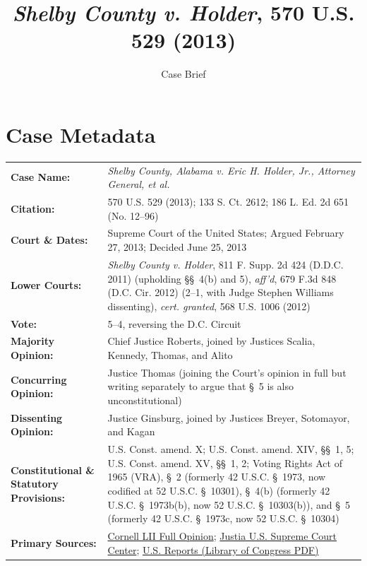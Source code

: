 \documentclass[12pt]{article}
\title{\textit{Shelby County v. Holder}, 570 U.S. 529 (2013)}
\author{Case Brief}
\date{}
\begin{document}
\maketitle


\section{Case Metadata}

\begin{tabular}{@{}p{}p{}@{}}
\textbf{Case Name:} & \emph{Shelby County, Alabama v. Eric H. Holder, Jr., Attorney General, et al.} \\
\textbf{Citation:} & 570 U.S. 529 (2013); 133 S. Ct. 2612; 186 L. Ed. 2d 651 (No. 12--96) \\
\textbf{Court \& Dates:} & Supreme Court of the United States; Argued February 27, 2013; Decided June 25, 2013 \\
\textbf{Lower Courts:} & \emph{Shelby County v. Holder}, 811 F. Supp. 2d 424 (D.D.C. 2011) (upholding \S\S~4(b) and 5), \emph{aff'd}, 679 F.3d 848 (D.C. Cir. 2012) (2--1, with Judge Stephen Williams dissenting), \emph{cert. granted}, 568 U.S. 1006 (2012) \\
\textbf{Vote:} & 5--4, reversing the D.C. Circuit \\
\textbf{Majority Opinion:} & Chief Justice Roberts, joined by Justices Scalia, Kennedy, Thomas, and Alito \\
\textbf{Concurring Opinion:} & Justice Thomas (joining the Court's opinion in full but writing separately to argue that \S~5 is also unconstitutional) \\
\textbf{Dissenting Opinion:} & Justice Ginsburg, joined by Justices Breyer, Sotomayor, and Kagan \\
\textbf{Constitutional \& Statutory Provisions:} & U.S. Const. amend. X; U.S. Const. amend. XIV, \S\S~1, 5; U.S. Const. amend. XV, \S\S~1, 2; Voting Rights Act of 1965 (VRA), \S~2 (formerly 42 U.S.C. \S~1973, now codified at 52 U.S.C. \S~10301), \S~4(b) (formerly 42 U.S.C. \S~1973b(b), now 52 U.S.C. \S~10303(b)), and \S~5 (formerly 42 U.S.C. \S~1973c, now 52 U.S.C. \S~10304) \\
\textbf{Primary Sources:} & \href{https://www.law.cornell.edu/supremecourt/text/12-96}{Cornell LII Full Opinion}; \href{https://supreme.justia.com/cases/federal/us/570/529/}{Justia U.S. Supreme Court Center}; \href{https://tile.loc.gov/storage-services/service/ll/usrep/usrep570/usrep570529/usrep570529.pdf}{U.S. Reports (Library of Congress PDF)} \\
\end{tabular}
\end{document}
